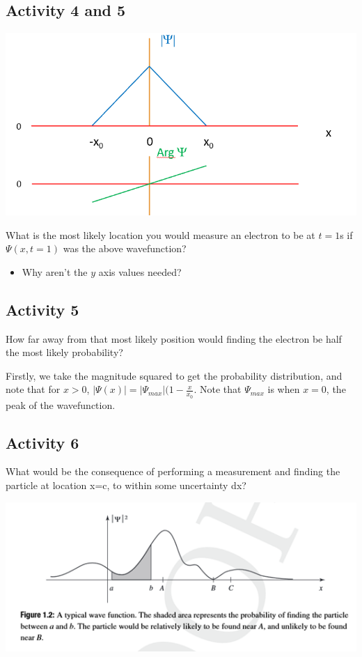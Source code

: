 \documentclass{article}
\begin{document}
\subsection{Activity 4 and 5}

\includegraphics[width = 0.7 \textwidth]{Lecture02/1.png}

What is the most likely location you would measure an electron to be at $t = 1$s if $\Psi(x,t=1)$ was the above wavefunction?

\begin{itemize}
    \item Why aren't the $y$ axis values needed?
\end{itemize}

\subsection*{Activity 5}

How far away from that most likely position would finding the electron be half the most likely probability?

Firstly, we take the magnitude squared to get the probability distribution, and note that for $x > 0$, $|\Psi(x)| = |\Psi_{max}| (1 - \frac{x}{x_0}$. Note that $\Psi_{max}$ is when $x = 0$, the peak of the wavefunction.

\subsection{Activity 6}

What would be the consequence of performing a measurement and finding the particle at location x=c, to within some uncertainty dx?

\includegraphics[width = 0.7 \textwidth]{Lecture02/2.png}
\end{document}
